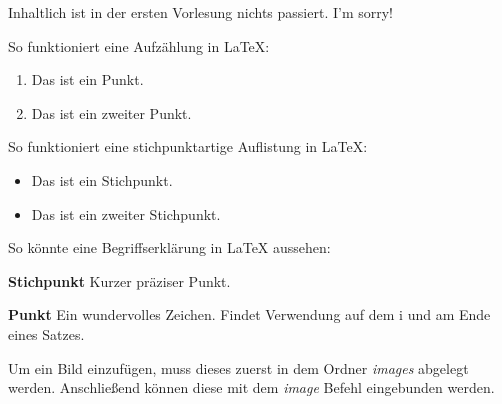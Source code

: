 Inhaltlich ist in der ersten Vorlesung nichts passiert. I'm sorry!


So funktioniert eine Aufzählung in LaTeX:

\begin{enumerate}
  \item Das ist ein Punkt.
  \item Das ist ein zweiter Punkt.
\end{enumerate}


So funktioniert eine stichpunktartige Auflistung in LaTeX:

\begin{itemize}
  \item Das ist ein Stichpunkt.
  \item Das ist ein zweiter Stichpunkt.
\end{itemize}

So könnte eine Begriffserklärung in LaTeX aussehen:

\begin{description}
  \item \textbf{Stichpunkt} Kurzer präziser Punkt.
  \item \textbf{Punkt} Ein wundervolles Zeichen. Findet Verwendung auf dem i und am Ende eines Satzes.
\end{description}

Um ein Bild einzufügen, muss dieses zuerst in dem Ordner \textit{images} abgelegt werden.
Anschließend können diese mit dem \textit{image} Befehl eingebunden werden.

